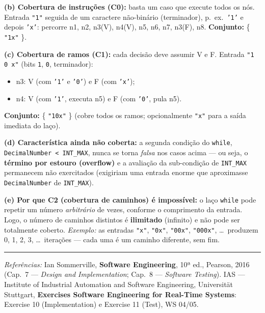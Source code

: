 \documentclass[11pt,a4paper]{article}
\begin{document}
\begin{resposta}
\textbf{(b) Cobertura de instruções (C0):} basta um caso que execute todos os
nós. Entrada \texttt{"1"} seguida de um caractere não-binário (terminador), p.\
ex.\ \texttt{'1'} e depois \texttt{'x'}:
percorre n1, n2, n3(V), n4(V), n5, n6, n7, n3(F), n8. \;
\textbf{Conjunto:} \{ \texttt{"1x"} \}.

\textbf{(c) Cobertura de ramos (C1):} cada decisão deve assumir V e F.
Entrada \texttt{"1 0 x"} (bits \texttt{1}, \texttt{0}, terminador):
\begin{itemize}[nosep]
  \item n3: V (com \texttt{'1'} e \texttt{'0'}) e F (com \texttt{'x'});
  \item n4: V (com \texttt{'1'}, executa n5) e F (com \texttt{'0'}, pula n5).
\end{itemize}
\textbf{Conjunto:} \{ \texttt{"10x"} \} (cobre todos os ramos; opcionalmente
\texttt{"x"} para a saída imediata do laço).

\textbf{(d) Característica ainda não coberta:} a segunda condição do \texttt{while},
\texttt{DecimalNumber < INT\_MAX}, nunca se torna \emph{falsa} nos casos acima —
ou seja, o \textbf{término por estouro (overflow)} e a avaliação da
sub-condição de \texttt{INT\_MAX} permanecem não exercitados (exigiriam uma
entrada enorme que aproximasse \texttt{DecimalNumber} de \texttt{INT\_MAX}).

\textbf{(e) Por que C2 (cobertura de caminhos) é impossível:} o laço
\texttt{while} pode repetir um número \emph{arbitrário} de vezes, conforme o
comprimento da entrada. Logo, o número de caminhos distintos é \textbf{ilimitado}
(infinito) e não pode ser totalmente coberto. \emph{Exemplo:} as entradas
\texttt{"x"}, \texttt{"0x"}, \texttt{"00x"}, \texttt{"000x"}, \dots\ produzem
0, 1, 2, 3, \dots\ iterações — cada uma é um caminho diferente, sem fim.
\end{resposta}

\vspace{8pt}\hrule\vspace{6pt}
\begin{center}
  {\small \textit{Referências:} Ian Sommerville, \textbf{Software Engineering},
  10ª ed., Pearson, 2016 (Cap.\ 7 — \textit{Design and Implementation};
  Cap.\ 8 — \textit{Software Testing}). \;
  IAS — Institute of Industrial Automation and Software Engineering,
  Universität Stuttgart, \textbf{Exercises Software Engineering for Real-Time
  Systems}: Exercise 10 (Implementation) e Exercise 11 (Test), WS 04/05.}
\end{center}
\end{document}
